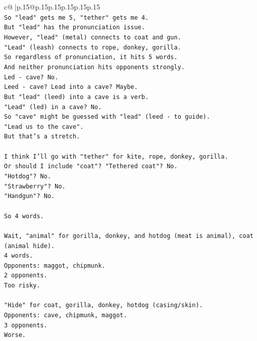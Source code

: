 \documentclass{article}
\begin{document}
{\begin{supertabular}{c@{$\;$}|p{.15\linewidth}@{}p{.15\linewidth}p{.15\linewidth}p{.15\linewidth}p{.15\linewidth}p{.15\linewidth}}
{{{\\ 
\texttt{So "lead" gets me 5, "tether" gets me 4.} \\
\texttt{But "lead" has the pronunciation issue.} \\
\texttt{However, "lead" (metal) connects to coat and gun.} \\
\texttt{"Lead" (leash) connects to rope, donkey, gorilla.} \\
\texttt{So regardless of pronunciation, it hits 5 words.} \\
\texttt{And neither pronunciation hits opponents strongly.} \\
\texttt{Led {-} cave? No.} \\
\texttt{Leed {-} cave? Lead into a cave? Maybe.} \\
\texttt{But "lead" (leed) into a cave is a verb.} \\
\texttt{"Lead" (led) in a cave? No.} \\
\texttt{So "cave" might be guessed with "lead" (leed {-} to guide).} \\
\texttt{"Lead us to the cave".} \\
\texttt{But that's a stretch.} \\
\\ 
\texttt{I think I'll go with "tether" for kite, rope, donkey, gorilla.} \\
\texttt{Or should I include "coat"? "Tethered coat"? No.} \\
\texttt{"Hotdog"? No.} \\
\texttt{"Strawberry"? No.} \\
\texttt{"Handgun"? No.} \\
\\ 
\texttt{So 4 words.} \\
\\ 
\texttt{Wait, "animal" for gorilla, donkey, and hotdog (meat is animal), coat (animal hide).} \\
\texttt{4 words.} \\
\texttt{Opponents: maggot, chipmunk.} \\
\texttt{2 opponents.} \\
\texttt{Too risky.} \\
\\ 
\texttt{"Hide" for coat, gorilla, donkey, hotdog (casing/skin).} \\
\texttt{Opponents: cave, chipmunk, maggot.} \\
\texttt{3 opponents.} \\
\texttt{Worse.} \\
}}}
\end{supertabular}}
\end{document}
